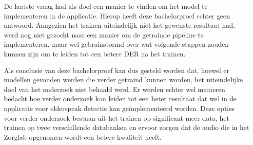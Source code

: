De laatste vraag had als doel een manier te vinden om het model te implementeren in de applicatie. Hierop heeft deze bachelorproef echter geen antwoord. Aangezien het trainen uiteindelijk niet het gewenste resultaat had, werd nog niet gezocht naar een manier om de getrainde pipeline te implementeren, maar wel gebrainstormd over wat volgende stappen zouden kunnen zijn om te leiden tot een betere DER na het trainen.

Als conclusie van deze bachelorproef kan dus gesteld worden dat, hoewel er modellen gevonden werden die verder getraind kunnen worden, het uiteindelijke doel van het onderzoek niet behaald werd. Er werden echter wel manieren bedacht hoe verder onderzoek kan leiden tot een beter resultaat dat wel in de applicatie voor elderspeak detectie kan geïmplementeerd worden. Deze opties voor verder onderzoek bestaan uit het trainen op significant meer data, het trainen op twee verschillende databanken en ervoor zorgen dat de audio die in het Zorglab opgenomen wordt een betere kwaliteit heeft.